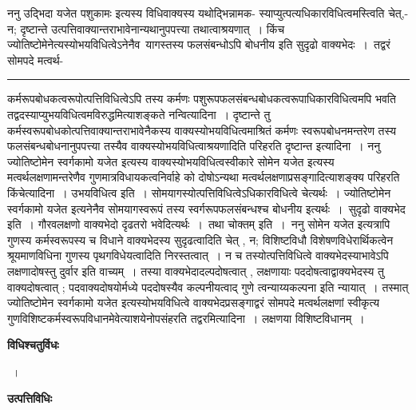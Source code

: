 \documentclass[11pt, openany]{book}
\makeatletter
\def\blfootnote{\gdef\@thefnmark{}\@footnotetext}
\makeatother
\begin{document}
 {\br ननु} {\qt उद्भिदा यजेत पशुकामः} इत्यस्य विधिवाक्यस्य यथोद्भिन्नामक-
\newpage
\fancyhead[LO]{विधित्वम् ]}
{\bl\noindent स्याप्युत्पत्यधिकारविधित्वमस्त्विति चेत्,- न; दृष्टान्ते उत्पत्तिवाक्यान्तराभावेनान्यथानुपपत्त्या तथात्वाश्रयणात्~। किंच ज्योतिष्टोमेनेत्यस्योभयविधित्वेऽनेनैव\footnotemark\ यागस्तस्य फलसंबन्धोऽपि बोधनीय इति सुदृढो वाक्यभेदः~।~तद्वरं सोमपदे मत्वर्थ-\\} 
\hrule
\vspace{3mm}
\noindent
कर्मरूपबोधकत्वरूपोत्पत्तिविधित्वेऽपि तस्य कर्मणः पशुरूपफलसंबन्धबोधकत्वरूपाधिकारविधित्वमपि भवति तद्वदस्याप्युभयविधित्वमविरुद्धमित्याशङ्कते {\br नन्वित्यादिना~।} दृष्टान्ते तु कर्मस्वरूपबोधकोत्पत्तिवाक्यान्तराभावेनैकस्य वाक्यस्योभयविधित्वमाश्रितं कर्मणः स्वरूपबोधनमन्तरेण तस्य फलसंबन्धबोधनानुपपत्त्या तस्यैव वाक्यस्योभयविधित्वाश्रयणादिति परिहरति {\br दृष्टान्त इत्यादिना~।}  ननु {\qt ज्योतिष्टोमेन स्वर्गकामो यजेत} इत्यस्य वाक्यस्योभयविधित्वस्वीकारे {\qt सोमेन यजेत} इत्यस्य मत्वर्थलक्षणामन्तरेणैव गुणमात्रविधायकत्वनिर्वाहे को दोषोऽन्यथा मत्वर्थलक्षणाप्रसङ्गादित्याशङ्क्य परिहरति {\br किंचेत्यादिना~। उभयविधित्व इति~।} सोमयागस्योत्पत्तिविधित्वेऽधिकारविधित्वे चेत्यर्थः~। {\qt ज्योतिष्टोमेन स्वर्गकामो यजेत} इत्यनेनैव सोमयागस्वरूपं तस्य स्वर्गरूपफलसंबन्धश्च बोधनीय इत्यर्थः~।~{\br सुदृढो वाक्यभेद इति~।} गौरवलक्षणो वाक्यभेदो दृढतरो भवेदित्यर्थः~।~तथा चोक्तम्  इति~।~{\br ननु} {\qt सोमेन यजेत} इत्यत्रापि गुणस्य कर्मस्वरूपस्य च विधाने वाक्यभेदस्य सुदृढत्वादिति चेत् , न; विशिष्टविधौ विशेषणविधेरार्थिकत्वेन श्रूयमाणविधिना गुणस्य पृथगविधेयत्वादिति निरस्तत्वात्~। न च तस्योत्पत्तिविधित्वे वाक्यभेदस्याभावेऽपि लक्षणादोषस्तु दुर्वार इति वाच्यम्~। तस्या वाक्यभेदादल्पदोषत्वात् ,
लक्षणायाः पददोषत्वाद्वाक्यभेदस्य तु वाक्यदोषत्वात् ; पदवाक्यदोषयोर्मध्ये पददोषस्यैव कल्पनीयत्वाद् {\qt गुणे त्वन्याय्यकल्पना} इति न्यायात्~। तस्मात् {\qt ज्योतिष्टोमेन स्वर्गकामो यजेत} इत्यस्योभयविधित्वे वाक्यभेदप्रसङ्गाद्वरं सोमपदे मत्वर्थलक्षणां स्वीकृत्य गुणविशिष्टकर्मस्वरूपविधानमेवेत्याशयेनोपसंहरति {\br तद्वरमित्यादिना~।}
\blfootnote{पाठ॰\textemdash\ $^{१}$तेनैव~।}
\newpage
\fancyhead[RE]{[ उत्पत्ति\textemdash\ }
{\bl\noindent
लक्षणया विशिष्टविधानम्~।}
\begin{center}
 \textbf{विधिश्चतुर्विधः }   
\end{center}
 
{
~।}
\begin{center}
 \textbf{उत्पत्तिविधिः}    
\end{center}
\end{document}
